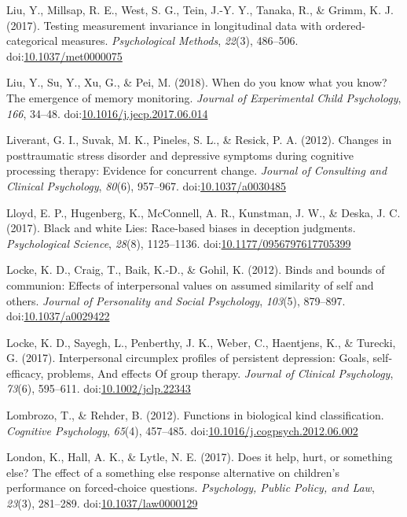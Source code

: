 \documentclass[english,man]{apa6}
\theoremstyle{definition}
\theoremstyle{definition}
\theoremstyle{definition}
\theoremstyle{remark}
\begin{document}
\hypertarget{ref-Liu2017a}{}
Liu, Y., Millsap, R. E., West, S. G., Tein, J.-Y. Y., Tanaka, R., \&
Grimm, K. J. (2017). Testing measurement invariance in longitudinal data
with ordered-categorical measures. \emph{Psychological Methods},
\emph{22}(3), 486--506.
doi:\href{https://doi.org/10.1037/met0000075}{10.1037/met0000075}

\hypertarget{ref-Liu2018}{}
Liu, Y., Su, Y., Xu, G., \& Pei, M. (2018). When do you know what you
know? The emergence of memory monitoring. \emph{Journal of Experimental
Child Psychology}, \emph{166}, 34--48.
doi:\href{https://doi.org/10.1016/j.jecp.2017.06.014}{10.1016/j.jecp.2017.06.014}

\hypertarget{ref-Liverant2012}{}
Liverant, G. I., Suvak, M. K., Pineles, S. L., \& Resick, P. A. (2012).
Changes in posttraumatic stress disorder and depressive symptoms during
cognitive processing therapy: Evidence for concurrent change.
\emph{Journal of Consulting and Clinical Psychology}, \emph{80}(6),
957--967. doi:\href{https://doi.org/10.1037/a0030485}{10.1037/a0030485}

\hypertarget{ref-Lloyd2017}{}
Lloyd, E. P., Hugenberg, K., McConnell, A. R., Kunstman, J. W., \&
Deska, J. C. (2017). Black and white Lies: Race-based biases in
deception judgments. \emph{Psychological Science}, \emph{28}(8),
1125--1136.
doi:\href{https://doi.org/10.1177/0956797617705399}{10.1177/0956797617705399}

\hypertarget{ref-Locke}{}
Locke, K. D., Craig, T., Baik, K.-D., \& Gohil, K. (2012). Binds and
bounds of communion: Effects of interpersonal values on assumed
similarity of self and others. \emph{Journal of Personality and Social
Psychology}, \emph{103}(5), 879--897.
doi:\href{https://doi.org/10.1037/a0029422}{10.1037/a0029422}

\hypertarget{ref-Locke2017}{}
Locke, K. D., Sayegh, L., Penberthy, J. K., Weber, C., Haentjens, K., \&
Turecki, G. (2017). Interpersonal circumplex profiles of persistent
depression: Goals, self-efficacy, problems, And effects Of group
therapy. \emph{Journal of Clinical Psychology}, \emph{73}(6), 595--611.
doi:\href{https://doi.org/10.1002/jclp.22343}{10.1002/jclp.22343}

\hypertarget{ref-Lombrozo2012}{}
Lombrozo, T., \& Rehder, B. (2012). Functions in biological kind
classification. \emph{Cognitive Psychology}, \emph{65}(4), 457--485.
doi:\href{https://doi.org/10.1016/j.cogpsych.2012.06.002}{10.1016/j.cogpsych.2012.06.002}

\hypertarget{ref-London2017}{}
London, K., Hall, A. K., \& Lytle, N. E. (2017). Does it help, hurt, or
something else? The effect of a something else response alternative on
children's performance on forced-choice questions. \emph{Psychology,
Public Policy, and Law}, \emph{23}(3), 281--289.
doi:\href{https://doi.org/10.1037/law0000129}{10.1037/law0000129}
\end{document}
